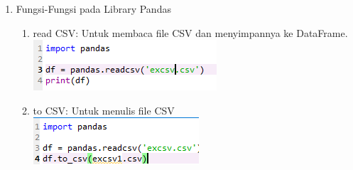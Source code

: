 \begin{enumerate}
\item Fungsi-Fungsi pada Library Pandas\\
\begin{enumerate}
\item read CSV: Untuk membaca file CSV dan menyimpannya ke DataFrame.\\
\includegraphics{gambar/csv5.png}
\item to CSV: Untuk menulis file CSV\\
\includegraphics{gambar/csv6.png}
\end{enumerate}

\end{enumerate}


